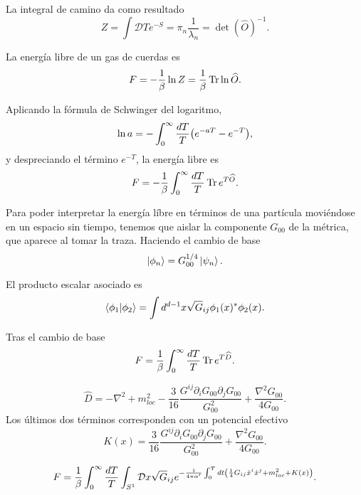 La integral de camino da como resultado
\begin{equation}
  Z=\int \mathcal D T e^{-S} =\pi_n \frac{1}{\lambda_n} = \det(\widehat O)^{-1}.
\end{equation}

La energía libre de un gas de cuerdas es
\begin{equation}
  F=-\frac{1}{\beta}\ln Z =\frac{1}{\beta} \Tr \ln \widehat O.
\end{equation}

Aplicando la fórmula de Schwinger del logaritmo, 
\begin{equation}
  \ln a = -\int_0^\infty \frac{dT}{T}\qty(e^{-aT}-e^{-T}),
\end{equation}
y despreciando el término $e^{-T}$, la energía libre es
\begin{equation}
  F=-\frac{1}{\beta}\int_0^\infty \frac{dT}{T} \Tr e^{T\widehat O}.
\end{equation}

Para poder interpretar la energía líbre en términos de una partícula
moviéndose en un espacio sin tiempo, tenemos que aislar la componente $G_{00}$
de la métrica, que aparece al tomar la traza.
Haciendo el cambio de base
\begin{equation}
  \ket{\phi_n}=G_{00}^{1/4}  \ket{\psi_n}.
\end{equation}

El producto escalar asociado es
\begin{equation}
  \braket{\phi_1}{\phi_2} = \int d^{d-1} x \sqrt G_{ij} \phi_1(x)^* \phi_2(x).
\end{equation}

Tras el cambio de base
\begin{equation}
  F=\frac{1}{\beta}\int_0^\infty \frac{dT}{T} \Tr e^{T\widehat D}.
\end{equation}

\begin{equation}
  \widehat D = -\nabla^2  + m_{loc}^2- \frac{3}{16}\frac{G^{ij} \partial_i G_{00}\partial_j G_{00}}{G_{00}^2}
  +\frac{\nabla^2 G_{00}}{4G_{00}}.
\end{equation}
Los últimos dos términos corresponden con un potencial efectivo
\begin{equation}
  K(x) = \frac{3}{16}\frac{G^{ij} \partial_i G_{00}\partial_j G_{00}}{G_{00}^2}
  +\frac{\nabla^2 G_{00}}{4G_{00}}.
\end{equation}

\begin{equation}
  F=\frac{1}{\beta}\int_0^\infty \frac{dT}{T} \int_{S^1} \mathcal D x\sqrt G_{ij}  e^{ -\frac{1}{4\pi\alpha'}\int_0^T dt \qty(  
  \frac{1}{4}G_{ij}\dot x^i \dot x^j  + m_{loc}^2+K(x) )}.
\end{equation}




